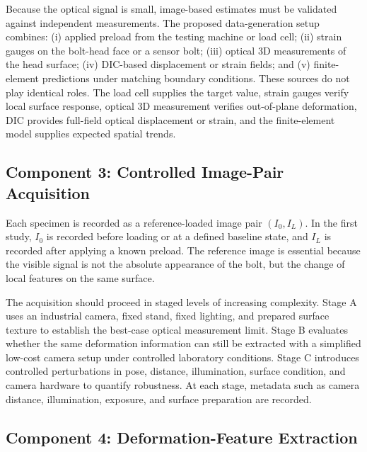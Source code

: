 Because the optical signal is small, image-based estimates must be validated against independent measurements. The proposed data-generation setup combines: (i) applied preload from the testing machine or load cell; (ii) strain gauges on the bolt-head face or a sensor bolt; (iii) optical 3D measurements of the head surface; (iv) DIC-based displacement or strain fields; and (v) finite-element predictions under matching boundary conditions. These sources do not play identical roles. The load cell supplies the target value, strain gauges verify local surface response, optical 3D measurement verifies out-of-plane deformation, DIC provides full-field optical displacement or strain, and the finite-element model supplies expected spatial trends.

\subsection{Component 3: Controlled Image-Pair Acquisition}

Each specimen is recorded as a reference-loaded image pair $(I_0,I_L)$. In the first study, $I_0$ is recorded before loading or at a defined baseline state, and $I_L$ is recorded after applying a known preload. The reference image is essential because the visible signal is not the absolute appearance of the bolt, but the change of local features on the same surface.

The acquisition should proceed in staged levels of increasing complexity. Stage A uses an industrial camera, fixed stand, fixed lighting, and prepared surface texture to establish the best-case optical measurement limit. Stage B evaluates whether the same deformation information can still be extracted with a simplified low-cost camera setup under controlled laboratory conditions. Stage C introduces controlled perturbations in pose, distance, illumination, surface condition, and camera hardware to quantify robustness. At each stage, metadata such as camera distance, illumination, exposure, and surface preparation are recorded.
\subsection{Component 4: Deformation-Feature Extraction}

